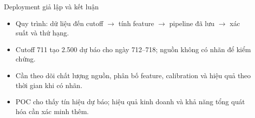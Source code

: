 \documentclass[aspectratio=169,10pt]{beamer}
\begin{document}
\begin{frame}{Deployment giả lập và kết luận}
\begin{itemize}
  \item Quy trình: dữ liệu đến cutoff $\rightarrow$ tính feature $\rightarrow$ pipeline đã lưu $\rightarrow$ xác suất và thứ hạng.
  \item Cutoff 711 tạo 2.500 dự báo cho ngày 712--718; nguồn không có nhãn để kiểm chứng.
  \item Cần theo dõi chất lượng nguồn, phân bố feature, calibration và hiệu quả theo thời gian khi có nhãn.
  \item POC cho thấy tín hiệu dự báo; hiệu quả kinh doanh và khả năng tổng quát hóa cần xác minh thêm.
\end{itemize}
\end{frame}
\end{document}
